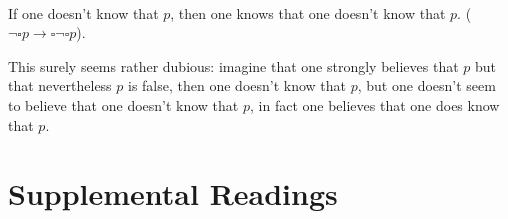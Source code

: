 \ex {}\\
If one doesn't know that $p$, then one knows that one doesn't know that $p$.
($\neg\square p \rightarrow \square\neg\square p$). \xe

This surely seems rather dubious: imagine that one strongly believes that $p$
but that nevertheless $p$ is false, then one doesn't know that $p$, but one
doesn't seem to believe that one doesn't know that $p$, in fact one believes
that one does know that $p$.

% 


\section{Supplemental Readings}

